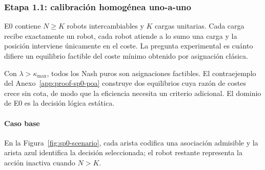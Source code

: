 \subsubsection{Etapa 1.1: calibración homogénea uno-a-uno}
\label{subsubsec:sp1-calibration}

E0 contiene \(N\geq K\) robots intercambiables y \(K\) cargas unitarias. Cada carga recibe exactamente un robot, cada robot atiende a lo sumo una carga y la posición interviene únicamente en el coste. La pregunta experimental es cuánto difiere un equilibrio factible del coste mínimo obtenido por asignación clásica.

Con \(\lambda>\kappa_{\max}\), todos los Nash puros son asignaciones factibles. El contraejemplo del Anexo~\ref{app:proof-sp0-poa} construye dos equilibrios cuya razón de costes crece sin cota, de modo que la eficiencia necesita un criterio adicional. El dominio de E0 es la decisión lógica estática.

\paragraph{Caso base}

En la Figura~\ref{fig:sp0-scenario}, cada arista codifica una asociación admisible y la arista azul identifica la decisión seleccionada; el robot restante representa la acción inactiva cuando \(N>K\).

